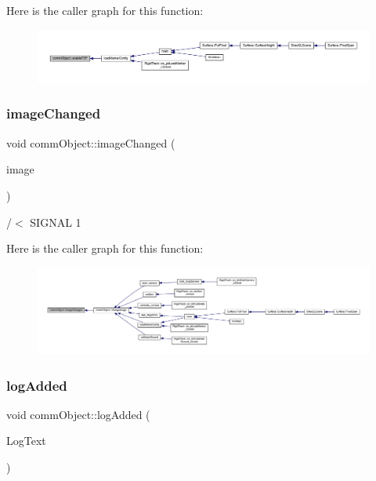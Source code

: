 Here is the caller graph for this function\+:\nopagebreak
\begin{figure}[H]
\begin{center}
\leavevmode
\includegraphics[width=350pt]{classcomm_object_a7552116eb5e18c49c6dcf943de29af7a_icgraph}
\end{center}
\end{figure}
\mbox{\label{classcomm_object_a3828eab6be234f6216a6f80a6a82e41e}} 
\subsubsection{\texorpdfstring{image\+Changed}{imageChanged}}
{\footnotesize\ttfamily void comm\+Object\+::image\+Changed (\begin{DoxyParamCaption}\item[{Q\+Pixmap}]{image }\end{DoxyParamCaption})\hspace{0.3cm}{\ttfamily [signal]}}



/$<$ S\+I\+G\+N\+AL 1 

Here is the caller graph for this function\+:\nopagebreak
\begin{figure}[H]
\begin{center}
\leavevmode
\includegraphics[width=350pt]{classcomm_object_a3828eab6be234f6216a6f80a6a82e41e_icgraph}
\end{center}
\end{figure}
\mbox{\label{classcomm_object_a72620fe1bac16309baf6d148644edaf9}} 
\subsubsection{\texorpdfstring{log\+Added}{logAdded}}
{\footnotesize\ttfamily void comm\+Object\+::log\+Added (\begin{DoxyParamCaption}\item[{Q\+String}]{Log\+Text }\end{DoxyParamCaption})\hspace{0.3cm}{\ttfamily [signal]}}



